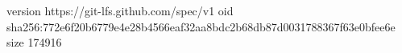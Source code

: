 version https://git-lfs.github.com/spec/v1
oid sha256:772e6f20b6779e4e28b4566eaf32aa8bdc2b68db87d0031788367f63e0bfee6e
size 174916
